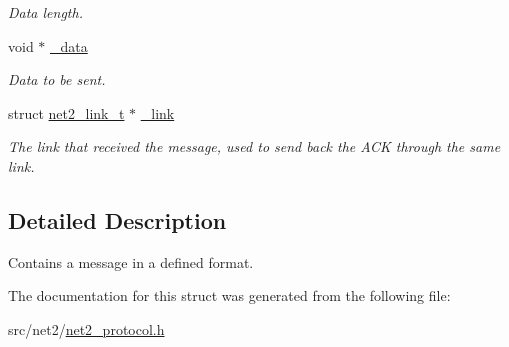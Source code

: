 \begin{DoxyCompactItemize}
\begin{DoxyCompactList}\small\item\em Data length. \end{DoxyCompactList}\item 
\hypertarget{structnet2__message__t_a157cea10e17c189684e71e2f4c30b217}{}void $\ast$ \hyperlink{structnet2__message__t_a157cea10e17c189684e71e2f4c30b217}{\+\_\+data}\label{structnet2__message__t_a157cea10e17c189684e71e2f4c30b217}

\begin{DoxyCompactList}\small\item\em Data to be sent. \end{DoxyCompactList}\item 
\hypertarget{structnet2__message__t_ad3c6032953e3934d4e833daae04051ae}{}struct \hyperlink{structnet2__link__t}{net2\+\_\+link\+\_\+t} $\ast$ \hyperlink{structnet2__message__t_ad3c6032953e3934d4e833daae04051ae}{\+\_\+link}\label{structnet2__message__t_ad3c6032953e3934d4e833daae04051ae}

\begin{DoxyCompactList}\small\item\em The link that received the message, used to send back the A\+C\+K through the same link. \end{DoxyCompactList}\end{DoxyCompactItemize}


\subsection{Detailed Description}
Contains a message in a defined format. 

The documentation for this struct was generated from the following file\+:\begin{DoxyCompactItemize}
\item 
src/net2/\hyperlink{net2__protocol_8h}{net2\+\_\+protocol.\+h}\end{DoxyCompactItemize}
